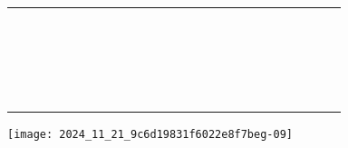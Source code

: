 \documentclass[10pt]{article}
\begin{document}
\begin{center}
\begin{tabular}{|c|c|c|c|c|c|c|c|c|c|c|c|c|c|c|c|c|c|c|c|c|c|c|}
\hline
 &  &  &  &  &  &  &  &  &  &  &  &  &  &  &  &  &  &  &  &  &  &  \\
\hline
 &  &  &  &  &  &  &  &  &  &  &  &  &  &  &  &  &  &  &  &  &  &  \\
\hline
 &  &  &  &  &  &  &  &  &  &  &  &  &  &  &  &  &  &  &  &  &  &  \\
\hline
 &  &  &  &  &  &  &  &  &  &  &  &  &  &  &  &  &  &  &  &  &  &  \\
\hline
 &  &  &  &  &  &  &  &  &  &  &  &  &  &  &  &  &  &  &  &  &  &  \\
\hline
 &  &  &  &  &  &  &  &  &  &  &  &  &  &  &  &  &  &  &  &  &  &  \\
\hline
 &  &  &  &  &  &  &  &  &  &  &  &  &  &  &  &  &  &  &  &  &  &  \\
\hline
 &  &  &  &  &  &  &  &  &  &  &  &  &  &  &  &  &  &  &  &  &  &  \\
\hline
 &  &  &  &  &  &  &  &  &  &  &  &  &  &  &  &  &  &  &  &  &  &  \\
\hline
 &  &  &  &  &  &  &  &  &  &  &  &  &  &  &  &  &  &  &  &  &  &  \\
\hline
 &  &  &  &  &  &  &  &  &  &  &  &  &  &  &  &  &  &  &  &  &  &  \\
\hline
 &  &  &  &  &  &  &  &  &  &  &  &  &  &  &  &  &  &  &  &  &  &  \\
\hline
 &  &  &  &  &  &  &  &  &  &  &  &  &  &  &  &  &  &  &  &  &  &  \\
\hline
 &  &  &  &  &  &  &  &  &  &  &  &  &  &  &  &  &  &  &  &  &  &  \\
\hline
 &  &  &  &  &  &  &  &  &  &  &  &  &  &  &  &  &  &  &  &  &  &  \\
\hline
 &  &  &  &  &  &  &  &  &  &  &  &  &  &  &  &  &  &  &  &  &  &  \\
\hline
 &  &  &  &  &  &  &  &  &  &  &  &  &  &  &  &  &  &  &  &  &  &  \\
\hline
 &  &  &  &  &  &  &  &  &  &  &  &  &  &  &  &  &  &  &  &  &  &  \\
\hline
 &  &  &  &  &  &  &  &  &  &  &  &  &  &  &  &  &  &  &  &  &  &  \\
\hline
 &  &  &  &  &  &  &  &  &  &  &  &  &  &  &  &  &  &  &  &  &  &  \\
\hline
\end{tabular}
\end{center}

\begin{center}
\texttt{[image: 2024\_11\_21\_9c6d19831f6022e8f7beg-09]}
\end{center}
\end{document}
